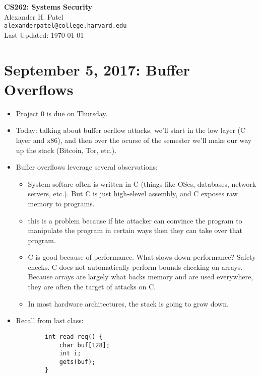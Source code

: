 \documentclass[12pt]{article}
\theoremstyle{definition}
\begin{document}
\begin{center}
\textbf{CS262: Systems Security} \\
Alexander H. Patel \\
{\tt alexanderpatel@college.harvard.edu} \\
Last Updated: \today
\end{center}

\tableofcontents

\section{September 5, 2017: Buffer Overflows}

\begin{itemize}
    \itemsep0em 
	\item Project 0 is due on Thursday. 
    \item Today: talking about buffer oerflow attacks. we'll start in the low layer (C layer and x86), and then over the ocurse of the semester we'll make our way up the stack (Bitcoin, Tor, etc.).
    \item  Buffer overflows leverage several observations:
        \begin{itemize}
            \item System softare often is written in C (things like OSes, databases, network servers, etc.). But C is just high-elevel assembly, and C exposes raw memory to programs.
            \item this is a problem because if hte attacker can convince the program to manipulate the program in certain ways then they can take over that program.
            \item C is good because of performance. What slows down performance? Safety checks. C does not automatically perform bounds checking on arrays. Because arrays are largely what backs memory and are used everywhere, they are often the target of attacks on C.
            \item In most hardware architectures, the stack is going to grow down.
        \end{itemize}
    \item Recall from last class:
    \begin{lstlisting}
        int read_req() {
            char buf[128];
            int i;
            gets(buf);
        }
    \end{lstlisting}

\end{itemize}
\end{document}
